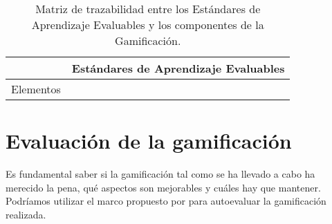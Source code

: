 \begin{table}[hbtp]
\caption{Matriz de trazabilidad entre los Estándares de Aprendizaje Evaluables y los componentes de la Gamificación.}
\label{Trazabilidad}
\begin{tabular}{c|c}
& Estándares de Aprendizaje Evaluables\\\hline
Elementos & \\\hline
\end{tabular}
\end{table}












\section{Evaluación de la gamificación}

Es fundamental saber si la gamificación tal como se ha llevado a cabo ha merecido la pena, qué aspectos son mejorables y cuáles hay que mantener.
%
Podríamos utilizar el marco propuesto por \cite{EvaluacionGamificacion} para autoevaluar la gamificación realizada.
